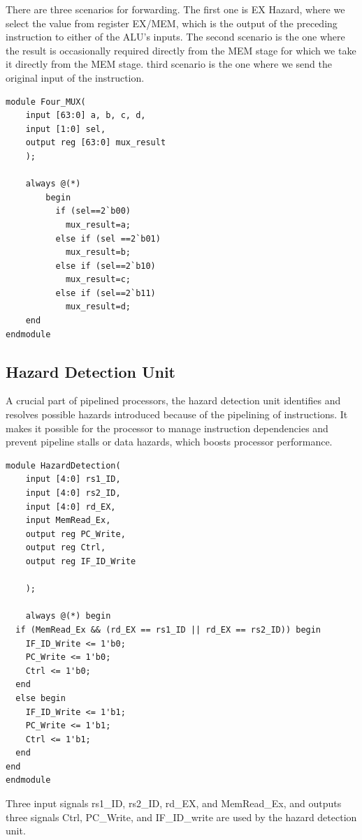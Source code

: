 \documentclass{article}
\begin{document}
There are three scenarios for forwarding. The first one is EX Hazard, where we select the value from register EX/MEM, which is the output of the preceding instruction to either of the ALU's inputs. The second scenario is the one where the result is occasionally required directly from the MEM stage for which we take it directly from the MEM stage. third scenario is the one where we send the original input of the instruction.

\begin{lstlisting}[caption={Four MUX}, captionpos=b, language=RISC-V]
module Four_MUX(
    input [63:0] a, b, c, d, 
    input [1:0] sel, 
    output reg [63:0] mux_result
    );
    
    always @(*)
        begin
          if (sel==2`b00)
            mux_result=a;
          else if (sel ==2`b01)
            mux_result=b;
          else if (sel==2`b10)
            mux_result=c;
          else if (sel==2`b11)
            mux_result=d;    
    end 
endmodule
\end{lstlisting}

\subsection{Hazard Detection Unit}
A crucial part of pipelined processors, the hazard detection unit identifies and resolves possible hazards introduced because of the pipelining of instructions. It makes it possible for the processor to manage instruction dependencies and prevent pipeline stalls or data hazards, which boosts processor performance. 

\begin{lstlisting}[caption={Hazard Detection Unit}, captionpos=b, language=RISC-V]
module HazardDetection(
    input [4:0] rs1_ID,
    input [4:0] rs2_ID,
    input [4:0] rd_EX,
    input MemRead_Ex,
    output reg PC_Write,
    output reg Ctrl,
    output reg IF_ID_Write
    
    );
    
    always @(*) begin
  if (MemRead_Ex && (rd_EX == rs1_ID || rd_EX == rs2_ID)) begin
    IF_ID_Write <= 1'b0;
    PC_Write <= 1'b0;
    Ctrl <= 1'b0;
  end
  else begin
    IF_ID_Write <= 1'b1;
    PC_Write <= 1'b1;
    Ctrl <= 1'b1;
  end
end
endmodule
\end{lstlisting}

Three input signals rs1\_ID, rs2\_ID, rd\_EX, and MemRead\_Ex, and outputs three signals Ctrl, PC\_Write, and IF\_ID\_write are used by the hazard detection unit.
\end{document}
